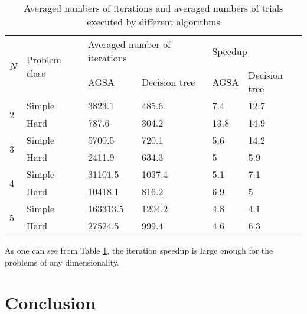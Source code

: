 \documentclass{cmi}
\begin{document}
\begin{table}[h!]
	\caption{Averaged numbers of iterations and averaged numbers of trials executed by different 
		algorithms}
	\label{tab:2}
	\centering
	\begin{tabular}{|l|l|ll|ll|}
		\hline
		\multirow{2}{*}{$N$} & \multirow{2}{*}{Problem class} & \multicolumn{2}{l|}{Averaged number   of iterations} & \multicolumn{2}{l|}{Speedup}              \\ \cline{3-6} 
		&                                & \multicolumn{1}{l|}{AGSA}         & Decision tree    & \multicolumn{1}{l|}{AGSA} & Decision tree \\ \hline
		\multirow{2}{*}{2}   & Simple                         & \multicolumn{1}{l|}{3823.1}       & 485.6            & \multicolumn{1}{l|}{7.4}  & 12.7          \\ \cline{2-6} 
		& Hard                           & \multicolumn{1}{l|}{787.6}        & 304.2            & \multicolumn{1}{l|}{13.8} & 14.9          \\ \hline
		\multirow{2}{*}{3}   & Simple                         & \multicolumn{1}{l|}{5700.5}       & 720.1            & \multicolumn{1}{l|}{5.6}  & 14.2          \\ \cline{2-6} 
		& Hard                           & \multicolumn{1}{l|}{2411.9}       & 634.3            & \multicolumn{1}{l|}{5}    & 5.9           \\ \hline
		\multirow{2}{*}{4}   & Simple                         & \multicolumn{1}{l|}{31101.5}      & 1037.4           & \multicolumn{1}{l|}{5.1}  & 7.1           \\ \cline{2-6} 
		& Hard                           & \multicolumn{1}{l|}{10418.1}      & 816.2            & \multicolumn{1}{l|}{6.9}  & 5             \\ \hline
		\multirow{2}{*}{5}   & Simple                         & \multicolumn{1}{l|}{163313.5}     & 1204.2           & \multicolumn{1}{l|}{4.8}  & 4.1           \\ \cline{2-6} 
		& Hard                           & \multicolumn{1}{l|}{27524.5}      & 999.4            & \multicolumn{1}{l|}{4.6}  & 6.3           \\ \hline
	\end{tabular}
\end{table}


As one can see from Table \ref{tab:2},  the iteration speedup is large enough for the problems of any  dimensionality. 


\section*{Conclusion} 
\end{document}
